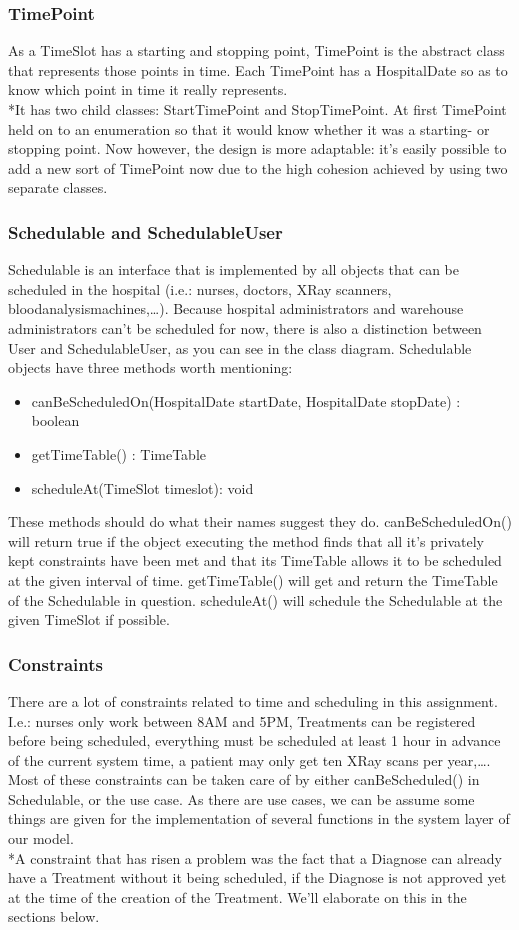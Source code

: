 \documentclass[11pt]{article}
\begin{document}
\subsubsection{TimePoint}
As a TimeSlot has a starting and stopping point, TimePoint is the abstract class that represents those points in time. Each TimePoint has a HospitalDate so as to know which point in time it really represents.
\\*It has two child classes: StartTimePoint and StopTimePoint. At first TimePoint held on to an enumeration so that it would know whether it was a starting- or stopping point. Now however, the design is more adaptable: it's easily possible to add a new sort of TimePoint now due to the high cohesion achieved by using two separate classes.

\subsubsection{Schedulable and SchedulableUser}
Schedulable is an interface that is implemented by all objects that can be scheduled in the hospital (i.e.: nurses, doctors, XRay scanners, bloodanalysismachines,…). Because hospital administrators and warehouse administrators can’t be scheduled for now, there is also a distinction between User and SchedulableUser, as you can see in the class diagram.
Schedulable objects have three methods worth mentioning: 
\begin{itemize}
\item{canBeScheduledOn(HospitalDate startDate, HospitalDate stopDate) : boolean}
\item{getTimeTable() : TimeTable}
\item{scheduleAt(TimeSlot timeslot): void}
\end{itemize}
These methods should do what their names suggest they do. canBeScheduledOn() will return true if the object executing the method finds that all it’s privately kept constraints have been met and that its TimeTable allows it to be scheduled at the given interval of time. getTimeTable() will get and return the TimeTable of the Schedulable in question. scheduleAt() will schedule the Schedulable at the given TimeSlot if possible.

\subsubsection{Constraints}
There are a lot of constraints related to time and scheduling in this assignment. I.e.: nurses only work between 8AM and 5PM, Treatments can be registered before being scheduled, everything must be scheduled at least 1 hour in advance of the current system time, a patient may only get ten XRay scans per year,\dots. Most of these constraints can be taken care of by either canBeScheduled() in Schedulable, or the use case. As there are use cases, we can be assume some things are given for the implementation of several functions in the system layer of our model.
\\*A constraint that has risen a problem was the fact that a Diagnose can already have a Treatment without it being scheduled, if the Diagnose is not approved yet at the time of the creation of the Treatment. We'll elaborate on this in the sections below.
\end{document}
